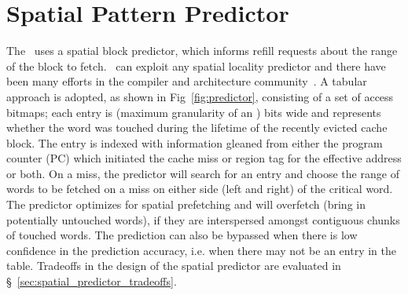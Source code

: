 \section{Spatial Pattern Predictor}
\label{sec:spatial_pattern_predictor}

The \AC\ uses a spatial block predictor, which  informs refill requests about the range of the block to fetch. \AC\ can exploit any spatial locality predictor and there have been many efforts in the compiler and architecture community~\cite{Chilimbi-Hill-pldi-1999, kumar-isca-1998, pujara-hpca-2006,chen-hpca-2004}. A tabular approach is adopted, as shown in Fig~\ref{fig:predictor}, consisting of a set of access bitmaps; each entry is  (maximum granularity of an \AB{}) bits wide and represents whether the word was touched during the lifetime of the recently evicted cache block. The entry is indexed with information gleaned from either the program counter (PC) which initiated the cache miss or region tag for the effective address or both. On a miss, the predictor will search for an entry  and choose the range of words to be fetched on a miss on either side (left and right) of the critical word. The predictor optimizes for spatial prefetching and will  overfetch (bring in potentially untouched words), if they are interspersed amongst contiguous chunks of touched words. The prediction can also be bypassed when there is low confidence in the prediction accuracy, i.e. when there may not be an entry in the table. Tradeoffs in the design of the spatial predictor are evaluated in \S~\ref{sec:spatial_predictor_tradeoffs}.



